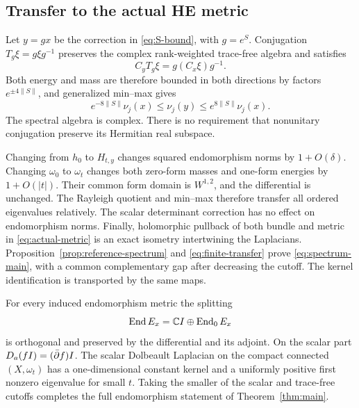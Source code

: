 \subsection{Transfer to the actual HE metric}
Let $y=gx$ be the correction in \eqref{eq:S-bound}, with $g=e^S$.
Conjugation $T_g\xi=g\xi g^{-1}$ preserves the complex rank-weighted
trace-free algebra and satisfies
\[
 C_yT_g\xi=g(C_x\xi)g^{-1}.
\]
Both energy and mass are therefore bounded in both directions by
factors $e^{\pm4\|S\|}$, and generalized min--max gives
\begin{equation}\label{eq:finite-transfer}
 e^{-8\|S\|}\nu_j(x)\le\nu_j(y)\le e^{8\|S\|}\nu_j(x).
\end{equation}
The spectral algebra is complex. There is no requirement that
nonunitary conjugation preserve its Hermitian real subspace.

Changing from $h_0$ to $H_{t,y}$ changes squared endomorphism norms
by $1+O(\delta)$. Changing $\omega_0$ to $\omega_t$ changes both
zero-form masses and one-form energies by $1+O(|t|)$.
Their common form domain is $W^{1,2}$, and the differential is unchanged.
The Rayleigh quotient and min--max therefore transfer all ordered
eigenvalues relatively. The scalar determinant correction has no
effect on endomorphism norms. Finally, holomorphic pullback of both
bundle and metric in \eqref{eq:actual-metric} is an exact isometry
intertwining the Laplacians. Proposition~\ref{prop:reference-spectrum}
and \eqref{eq:finite-transfer} prove
\eqref{eq:spectrum-main}, with a common complementary gap after
decreasing the cutoff. The kernel identification is transported by
the same maps.

For every induced endomorphism metric the splitting
\[
 \operatorname{End} E_x=\mathbb C I\oplus\operatorname{End}_0E_x
\]
is orthogonal and preserved by the differential and its adjoint.
On the scalar part $D_a(fI)=(\bar\partial f)I$.
The scalar Dolbeault Laplacian on the compact connected
$(X,\omega_t)$ has a one-dimensional constant kernel and a
uniformly positive first nonzero eigenvalue for small $t$.
Taking the smaller of the scalar and trace-free cutoffs completes
the full endomorphism statement of Theorem~\ref{thm:main}.

